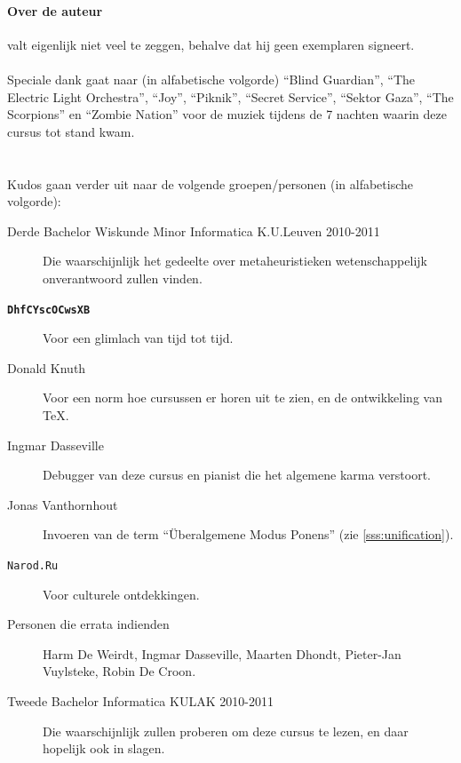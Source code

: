 \documentclass[titlepage,a4paper]{article}
\begin{document}
\begin{it}
\paragraph{Over de auteur} valt eigenlijk niet veel te zeggen, behalve dat hij geen exemplaren signeert.
\\\\
Speciale dank gaat naar (in alfabetische volgorde) ``Blind Guardian'', ``The Electric Light Orchestra'', ``Joy'', ``Piknik'', ``Secret Service'', ``Sektor Gaza'', ``The Scorpions'' en ``Zombie Nation'' voor de muziek tijdens de 7 nachten waarin deze cursus tot stand kwam.
\\\\\\
Kudos gaan verder uit naar de volgende groepen/personen (in alfabetische volgorde):
\begin{description}
 \item[Derde Bachelor Wiskunde Minor Informatica K.U.Leuven 2010-2011] Die waarschijnlijk het gedeelte over metaheuristieken wetenschappelijk onverantwoord zullen vinden.
 \item[\textbf{\texttt{DhfCYscOCwsXB}}] Voor een glimlach van tijd tot tijd.
 \item[Donald Knuth] Voor een norm hoe cursussen er horen uit te zien, en de ontwikkeling van \TeX{}.
 \item[Ingmar Dasseville] Debugger van deze cursus en pianist die het algemene karma verstoort.
 \item[Jonas Vanthornhout] Invoeren van de term ``\"Uberalgemene Modus Ponens'' (zie \ref{sss:unification}).
 \item[\texttt{Narod.Ru}] Voor culturele ontdekkingen.
 \item[Personen die errata indienden] Harm De Weirdt, Ingmar Dasseville, Maarten Dhondt, Pieter-Jan Vuylsteke, Robin De Croon.
 \item[Tweede Bachelor Informatica KULAK 2010-2011] Die waarschijnlijk zullen proberen om deze cursus te lezen, en daar hopelijk ook in slagen.
\end{description}
\end{it}









\appendix

\newpage
\listoffigures
\newpage
\printindex
\newpage
\end{document}
